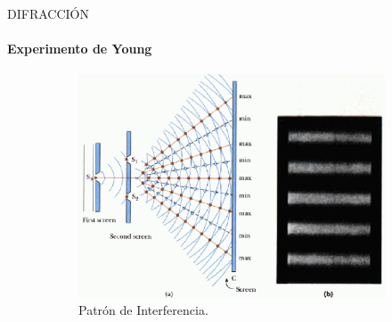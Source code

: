 \begin{frame}{DIFRACCIÓN}
    \framesubtitle{Experimento de Young}
    \begin{figure}
        \centering
        \begin{subfigure}[H]{0.4\textwidth}
            \includegraphics[width=\linewidth]{juanse/waves.png}
            \caption{Patrón de Interferencia\footnotemark{}.}
        \end{subfigure}
        \hspace{2cm}
        \begin{subfigure}[H]{0.4\textwidth}
        \end{subfigure}
    \end{figure}
    \addtocounter{footnote}{-1}
    \addtocounter{footnote}{1}
\end{frame}


